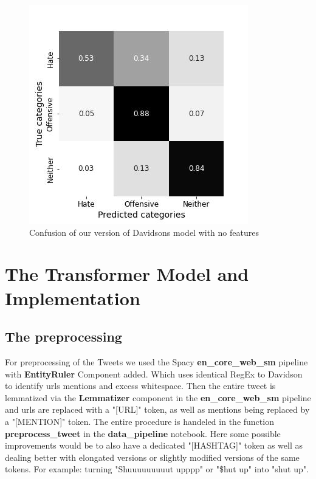 \documentclass[11pt,a4paper]{article}
\begin{document}
\begin{figure}[h]
  \includegraphics[width=\linewidth]{./tables-figures/nofeat_confusion.jpg}
  \caption{Confusion of our version of Davidsons model with no features}
  \label{fig:nofeature_confusion}
\end{figure}


\section{The Transformer Model and Implementation}

\subsection{The preprocessing}
For preprocessing of the Tweets we used the Spacy \textbf{en\_core\_web\_sm} pipeline with \textbf{EntityRuler} Component added.
Which uses identical RegEx to Davidson to identify urls mentions and excess whitespace.
Then the entire tweet is lemmatized via the \textbf{Lemmatizer} component in the \textbf{en\_core\_web\_sm} pipeline and urls 
are replaced with a "[URL]" token, as well as mentions being replaced by a "[MENTION]" token.
The entire procedure is handeled in the function \textbf{preprocess\_tweet} in the \textbf{data\_pipeline} notebook.
Here some possible improvements would be to also have a dedicated "[HASHTAG]" token as well as dealing better with elongated
versions or slightly modified versions of the same tokens. 
For example: turning "Shuuuuuuuuut upppp" or "\$hut up" into "shut up".
\end{document}
